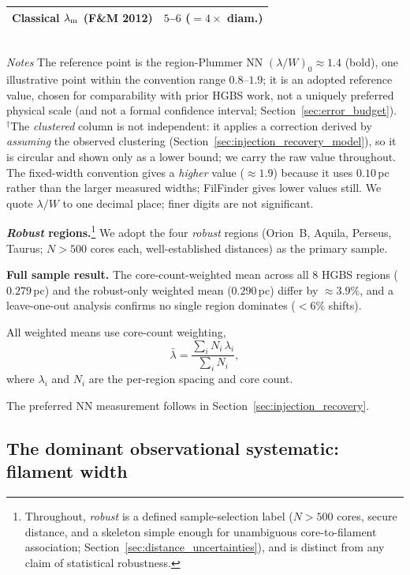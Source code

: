 \documentclass[usenatbib,twoside,twocolumn]{mnras}
\begin{document}
\begin{table}
\begin{tabular}{p{3.6cm}ccc}
Classical $\lambda_{\rm m}$ (F\&M 2012) & \multicolumn{3}{c}{$5$--$6$ ($=4\times$ diam.)} \\
\bottomrule
\end{tabular}
\\[2pt]
\footnotesize
\emph{Notes} The reference point is the region-Plummer NN $(\lambda/W)_0\approx1.4$ (bold), one illustrative point within the convention range $0.8$--$1.9$; it is an adopted reference value, chosen for comparability with prior HGBS work, not a uniquely preferred physical scale (and not a formal confidence interval; Section~\ref{sec:error_budget}). $^{\dagger}$The \emph{clustered} column is not independent: it applies a correction derived by \emph{assuming} the observed clustering (Section~\ref{sec:injection_recovery_model}), so it is circular and shown only as a lower bound; we carry the raw value throughout. The fixed-width convention gives a \emph{higher} value ($\approx1.9$) because it uses $0.10$\,pc rather than the larger measured widths; FilFinder gives lower values still. We quote $\lambda/W$ to one decimal place; finer digits are not significant.
\end{table}

\textbf{\emph{Robust} regions.}\footnote{Throughout, \emph{robust} is a defined sample-selection label ($N>500$ cores, secure distance, and a skeleton simple enough for unambiguous core-to-filament association; Section~\ref{sec:distance_uncertainties}), and is distinct from any claim of statistical robustness.} We adopt the four \emph{robust} regions (Orion~B, Aquila, Perseus, Taurus; $N>500$ cores each, well-established distances) as the primary sample.

\textbf{Full sample result.} The core-count-weighted mean across all 8 HGBS regions ($0.279$\,pc) and the robust-only weighted mean ($0.290$\,pc) differ by $\approx3.9\%$, and a leave-one-out analysis confirms no single region dominates ($<6\%$ shifts).

All weighted means use core-count weighting,
\begin{equation}
\bar{\lambda} = \frac{\sum_i N_i\,\lambda_i}{\sum_i N_i},
\label{eq:weighting}
\end{equation}
where $\lambda_i$ and $N_i$ are the per-region spacing and core count.

The preferred NN measurement follows in Section~\ref{sec:injection_recovery}.

\subsection{The dominant observational systematic: filament width}
\label{sec:widths}
\end{document}
